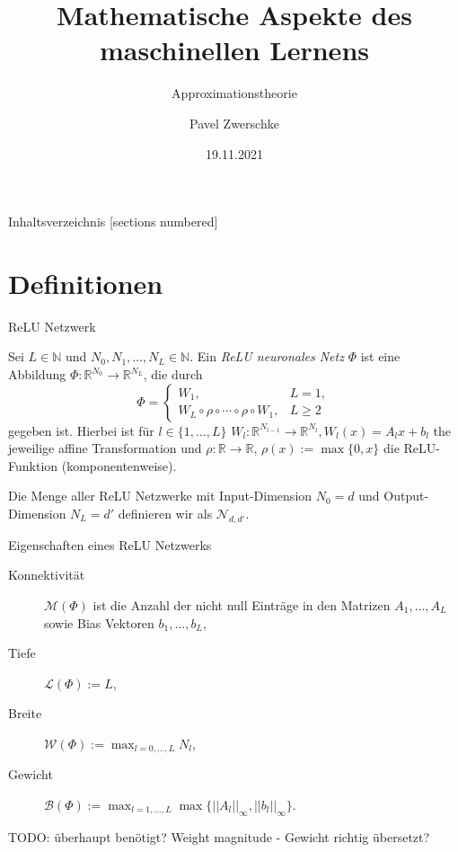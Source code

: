 \documentclass[10pt,aspectratio=169]{beamer}
\title{Mathematische Aspekte des maschinellen Lernens}
\subtitle{Approximationstheorie}
\date{19.11.2021}
\author{Pavel Zwerschke}
\institute{Karlsruher Institut für Technologie}
\newcommand{\N}{\mathbb{N}} %
\newcommand{\R}{\mathbb{R}} %
\newcommand{\set}[1]{\{#1\}}
\begin{document}
\maketitle

\begin{frame}{Inhaltsverzeichnis}
    [sections numbered]
    \tableofcontents%
\end{frame}

\section{Definitionen}

\begin{frame}{ReLU Netzwerk}
    \begin{definition}
        Sei \(L \in \N\) und \(N_0, N_1, \ldots, N_L \in \N\). Ein 
        \textit{ReLU neuronales Netz} \(\Phi\) ist eine Abbildung 
        \(\Phi: \R^{N_0} \rightarrow \R^{N_L}\), die durch 
        \[ \Phi = \begin{cases}
            W_1, & L = 1, \\
            W_L \circ \rho \circ \cdots \circ \rho \circ W_1, & L \geq 2
        \end{cases} \]
        gegeben ist. Hierbei ist für \(l\in \set{1,\ldots, L}\) \(W_l : \R^{N_{l-1}} \rightarrow \R^{N_l}, W_l(x) = A_l x + b_l\) 
        the jeweilige affine Transformation und \(\rho: \R \rightarrow \R\), \(\rho(x) := \max\set{0, x}\) 
        die ReLU-Funktion (komponentenweise).

        Die Menge aller ReLU Netzwerke mit Input-Dimension \(N_0 = d\) und Output-Dimension \(N_L = d'\) 
        definieren wir als \(\mathcal{N}_{d,d'}\).
    \end{definition}
\end{frame}

\begin{frame}{Eigenschaften eines ReLU Netzwerks}
    \begin{definition}
        \begin{description}
            \item[Konnektivität] \(\mathcal{M}(\Phi)\) ist die Anzahl der nicht null Einträge in den Matrizen \(A_1, \ldots, A_L\) 
            sowie Bias Vektoren \(b_1, \ldots, b_L\),
            \item[Tiefe] \(\mathcal{L}(\Phi) := L\),
            \item[Breite] \(\mathcal{W}(\Phi) := \max_{l=0,\ldots, L} N_l\),
            \item[Gewicht] \(\mathcal{B}(\Phi) := \max_{l=1,\ldots, L} \max\set{||A_l ||_\infty, ||b_l||_\infty}\).
        \end{description}
    \end{definition}
    TODO: überhaupt benötigt? Weight magnitude - Gewicht richtig übersetzt?
\end{frame}
\end{document}
